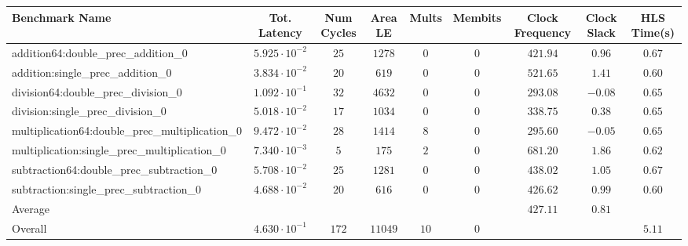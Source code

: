 \begin{tabular}{|l|c|c|c|c|c|c|c|c|}
\hline
Benchmark Name                                   & Tot. Latency            & Num Cycles & Area LE   & Mults  & Membits & Clock Frequency & Clock Slack & HLS Time(s) \\
\hline
addition64:double\_prec\_addition\_0             & $ 5.925 \cdot 10^{-2} $ & $ 25     $ & $ 1278  $ & $ 0  $ & $ 0   $ & $ 421.94      $ & $ 0.96    $ & $ 0.67    $ \\
addition:single\_prec\_addition\_0               & $ 3.834 \cdot 10^{-2} $ & $ 20     $ & $ 619   $ & $ 0  $ & $ 0   $ & $ 521.65      $ & $ 1.41    $ & $ 0.60    $ \\
division64:double\_prec\_division\_0             & $ 1.092 \cdot 10^{-1} $ & $ 32     $ & $ 4632  $ & $ 0  $ & $ 0   $ & $ 293.08      $ & $ -0.08   $ & $ 0.65    $ \\
division:single\_prec\_division\_0               & $ 5.018 \cdot 10^{-2} $ & $ 17     $ & $ 1034  $ & $ 0  $ & $ 0   $ & $ 338.75      $ & $ 0.38    $ & $ 0.65    $ \\
multiplication64:double\_prec\_multiplication\_0 & $ 9.472 \cdot 10^{-2} $ & $ 28     $ & $ 1414  $ & $ 8  $ & $ 0   $ & $ 295.60      $ & $ -0.05   $ & $ 0.65    $ \\
multiplication:single\_prec\_multiplication\_0   & $ 7.340 \cdot 10^{-3} $ & $ 5      $ & $ 175   $ & $ 2  $ & $ 0   $ & $ 681.20      $ & $ 1.86    $ & $ 0.62    $ \\
subtraction64:double\_prec\_subtraction\_0       & $ 5.708 \cdot 10^{-2} $ & $ 25     $ & $ 1281  $ & $ 0  $ & $ 0   $ & $ 438.02      $ & $ 1.05    $ & $ 0.67    $ \\
subtraction:single\_prec\_subtraction\_0         & $ 4.688 \cdot 10^{-2} $ & $ 20     $ & $ 616   $ & $ 0  $ & $ 0   $ & $ 426.62      $ & $ 0.99    $ & $ 0.60    $ \\
\hline
Average                                          & $                     $ & $        $ & $       $ & $    $ & $     $ & $ 427.11      $ & $ 0.81    $ & $         $ \\
\hline
Overall                                          & $ 4.630 \cdot 10^{-1} $ & $ 172    $ & $ 11049 $ & $ 10 $ & $ 0   $ & $             $ & $         $ & $ 5.11    $ \\
\hline
\end{tabular}
